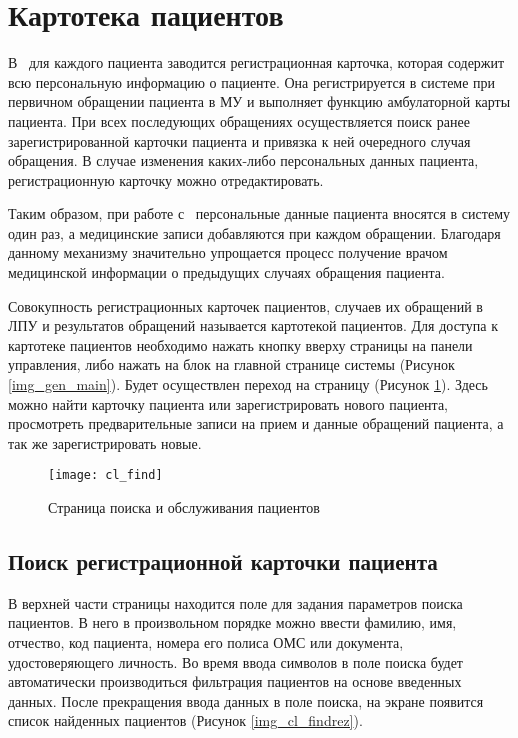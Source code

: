 \newpage
\section{Картотека пациентов}

В \tmis ~для каждого пациента заводится регистрационная карточка, которая содержит всю персональную информацию о пациенте. Она регистрируется в системе при первичном обращении пациента в МУ и выполняет функцию амбулаторной карты пациента. При всех последующих обращениях осуществляется поиск ранее зарегистрированной карточки пациента и привязка к ней очередного случая обращения. В случае изменения каких-либо персональных данных пациента, регистрационную карточку можно отредактировать. 

Таким образом, при работе с \tmis~персональные данные пациента вносятся в систему один раз, а медицинские записи добавляются при каждом обращении. Благодаря данному механизму значительно упрощается процесс получение врачом медицинской информации о предыдущих случаях обращения пациента.

Совокупность регистрационных карточек пациентов, случаев их обращений в ЛПУ и результатов обращений называется картотекой пациентов. Для доступа к картотеке пациентов необходимо нажать кнопку  вверху страницы на панели управления, либо нажать на блок  на главной странице системы (Рисунок \ref{img_gen_main}). Будет осуществлен переход на страницу  (Рисунок \ref{img_cl_find}). Здесь можно найти карточку пациента или зарегистрировать нового пациента, просмотреть предварительные записи на прием и данные обращений пациента, а так же зарегистрировать новые.

\begin{figure}[ht]\centering
 \texttt{[image: cl\_find]}
 \caption{Страница поиска и обслуживания пациентов}
 \label{img_cl_find}
\end{figure} 

\subsection{Поиск регистрационной карточки пациента} \label{cl_find}

В верхней части страницы находится поле для задания параметров поиска пациентов. В него в произвольном порядке можно ввести фамилию, имя, отчество, код пациента, номера его полиса ОМС или документа, удостоверяющего личность. Во время ввода символов в поле поиска будет автоматически производиться фильтрация пациентов на основе введенных данных. После прекращения ввода данных в поле поиска, на экране появится список найденных пациентов (Рисунок \ref{img_cl_findrez}).
 
